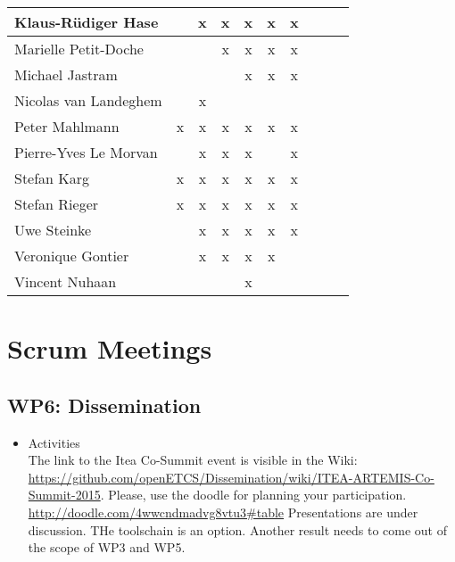 \documentclass[a4paper, 11pt]{article}
\begin{document}
\begin{tabular}{|l|c|c|c||c|c|c||c|c|c|}
Klaus-R\"udiger Hase &   & x & x & x & x & x \\\hline
Marielle Petit-Doche &   &   & x & x & x & x \\\hline
Michael Jastram      &   &   &   & x & x & x \\\hline
Nicolas van Landeghem&   & x &   &   &   &   \\\hline
Peter Mahlmann       & x & x & x & x & x & x \\\hline
Pierre-Yves Le Morvan&   & x & x & x &   & x \\\hline
Stefan Karg          & x & x & x & x & x & x \\\hline
Stefan Rieger        & x & x & x & x & x & x \\\hline
Uwe Steinke          &   & x & x & x & x & x \\\hline
Veronique Gontier    &   & x & x & x & x &   \\\hline
Vincent Nuhaan       &   &   &   & x &   &   \\\hline
\end{tabular}


\section{Scrum Meetings}

\subsection{WP6: Dissemination}
\begin{itemize}
\item Activities\\
The link to the Itea Co-Summit event is visible in the Wiki:
\url{https://github.com/openETCS/Dissemination/wiki/ITEA-ARTEMIS-Co-Summit-2015}. Please, use the doodle for planning your participation.
\url{http://doodle.com/4wwcndmadvg8vtu3#table} Presentations are under discussion. THe toolschain is an option. Another result needs to come out of the scope of WP3 and WP5.

\end{itemize}
\end{document}
